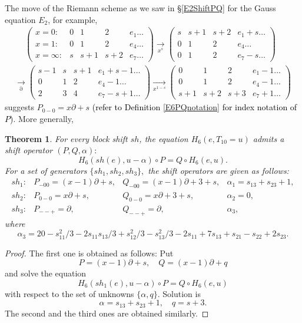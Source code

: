 \documentclass[a4paper,12pt]{article}
\newtheorem{thm}{Theorem}[section]  %
\theoremstyle{definition}
\theoremstyle{remark}
\numberwithin{equation}{section} %
\newcommand{\blue}[1]{\textcolor{black}{#1}}
\begin{document}
The move of the Riemann scheme as we saw in \S\ref{E2ShiftPQ} for the Gauss equation $E_2$, for example,
$$\begin{array}{l}\quad\ 
\left(\begin{array}{ccccl}
 x=0:& 0&1&2&e_1\dots\\
 x=1:& 0&1&2&e_4\dots\\
 x=\infty:& s&s+1&s+2&e_7\dots
\end{array}\right)
  \underset{x^s}{\to}
\left(\begin{array}{cccl}
  s&s+1&s+2&e_1+s\dots\\
  0&1&2&e_4\dots\\
  0&1&2&e_7-s\dots
\end{array}\right)\\[7mm]
  \underset{\partial}{\to}
\left(\begin{array}{cccl}
  s-1&s&s+1&e_1+s-1\dots\\
  0&1&2&e_4-1\dots\\
  2&3&4&e_7-s+1\dots
\end{array}\right)
\underset{x^{1-s}}{\to}
\left(\begin{array}{cccl}
  0&1&2&e_1-1\dots\\
  0&1&2&e_4-1\dots\\
  s+1&s+2&s+3&e_7+1\dots
\end{array}\right)
\end{array}$$
suggests $P_{0-0}=x\partial +s$ \blue{(refer to Definition \ref{E6PQnotation} for index notation of $P$)}. More generally, 
\begin{thm}\label{shopH6}For every block shift $sh$, the equation $H_6(e,T_{10}=u)$ admits a shift operator $(P,Q,\alpha):$
  $$H_6(sh(e), u-\alpha)\circ P=Q\circ H_6(e,u).$$ For a set of generators $\{sh_1,sh_2,sh_3\},$   the shift operators are given as follows:
  $$\begin{array}{llll}
sh_1: &P_{-00}=(x-1)\partial+s,&Q_{-00}=(x-1)\partial+3+s,&\alpha_1=s_{13}+s_{23}+1,\\[2mm]
sh_2: &P_{0-0}=x\partial+s,    &Q_{0-0}=x\partial+3+s ,   &\alpha_2=0,\\[2mm]
sh_3: &P_{--+}=\partial,       &Q_{--+}=\partial,         &\alpha_3,\end{array}$$
  where
  $$\alpha_3=20-s_{11}^2/3-2s_{11}s_{13}/3+s_{12}^2/3-s_{13}^2/3
  -2s_{11}+7s_{13}+s_{21}-s_{22}+2s_{23}.$$
\end{thm}
\begin{proof}%
The first one is obtained as follows: Put
\[P=(x-1)\partial+s,\quad Q=(x-1)\partial+ q\]
and solve the equation 
\[H_6(sh_1(e),u-\alpha)\circ P=Q\circ H_6(e,u)\]
with respect to the set of unknowns $\{\alpha,q\}$. 
Solution is
\[\alpha=s_{13}+s_{23}+1,\quad  q = s+3.\]
The second and the third ones are obtained similarly.\end{proof}
\end{document}
